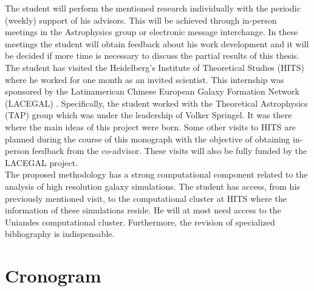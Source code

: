 \documentclass[12pt]{article}
\begin{document}


The student will perform the mentioned research individually with the periodic (weekly) support of his advisors. This will be achieved through in-person meetings in the Astrophysics group or electronic message interchange. 
In these meetings the student will obtain feedback about his work development and it will be decided if more time is necessary to discuss the partial results of this thesis. 
The student has visited  the Heidelberg's Institute of Theoretical Studies (HITS) where he worked for one month as an invited scientist.
This internship was sponsored by the Latinamerican Chinese European Galaxy Formation Network (LACEGAL) \cite{LACEGAL}. 
Specifically, the student worked with the Theoretical Astrophysics (TAP) group which was under the leadership of Volker Springel. 
It was there where the main ideas of this project were born.
 Some other visits to HITS are planned during the course of this monograph with the objective of obtaining in-person feedback from the co-advisor. 
These visits will also be fully funded by the LACEGAL project.\\

The proposed methodology has a strong computational component related to the analysis of high resolution galaxy simulations. 
The student has access, from his previously mentioned visit, to the computational cluster at HITS where the information of these simulations reside.
He will at most need access to the Uniandes computational cluster.
Furthermore, the revision of specialized bibliography is indispensable.\\


\section{Cronogram}
\end{document}
